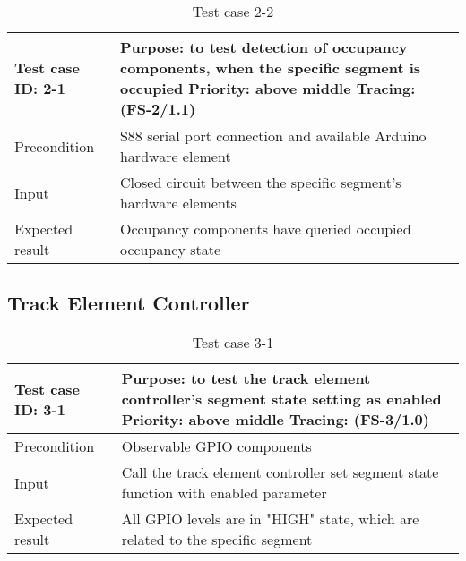 \begin{table}[H]
	\caption{Test case 2-2}
	\label{table:TCase-FS2-2}
	\begin{center}
		\renewcommand{\arraystretch}{1.8}
		\begin{tabu} 
			to 0.9 \textwidth
			{  X[0.3, l] X[l] }
			\toprule
			Test case ID: 2-1 & Purpose: to test detection of occupancy components, when the specific segment is occupied \newline Priority: above middle \newline Tracing: (FS-2/1.1) \\ \midrule
			Precondition      & S88 serial port connection and available Arduino hardware element                                                                                      \\
			Input             & Closed circuit between the specific segment's hardware elements                                                                                        \\
			Expected result   & Occupancy components have queried occupied occupancy state                                                                                             \\ \bottomrule
		\end{tabu}
	\end{center}
\end{table} 

\subsection{Track Element Controller}

\begin{table}[H]
	\caption{Test case 3-1}
	\label{table:TCase-FS3-1}
	\begin{center}
		\renewcommand{\arraystretch}{1.8}
		\begin{tabu} 
			to 0.9 \textwidth
			{  X[0.3, l] X[l] }
			\toprule
			Test case ID: 3-1 & Purpose: to test the track element controller's segment state setting as enabled \newline Priority: above middle \newline Tracing: (FS-3/1.0) \\ \midrule
			Precondition      & Observable GPIO components                                                                                                                    \\
			Input             & Call the track element controller set segment state function with enabled parameter                                                           \\
			Expected result   & All GPIO levels are in "HIGH" state, which are related to the specific segment                                                                \\ \bottomrule
		\end{tabu}
	\end{center}
\end{table}

